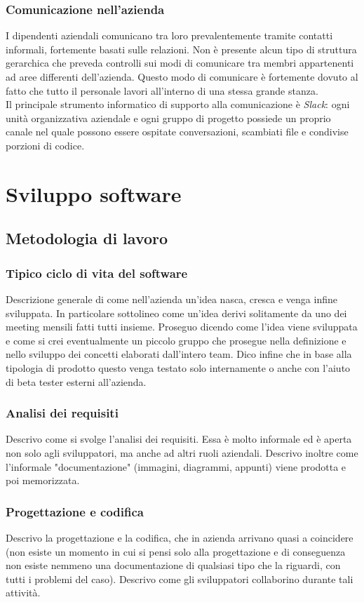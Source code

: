 			\subsubsection{Comunicazione nell'azienda}
				I dipendenti aziendali comunicano tra loro prevalentemente tramite contatti informali, fortemente basati sulle
				relazioni. Non è presente alcun tipo di struttura gerarchica che preveda controlli sui modi di comunicare tra membri
				appartenenti ad aree differenti dell'azienda. Questo modo di comunicare è fortemente dovuto al fatto che tutto il
				personale lavori all'interno di una stessa grande stanza.\\
				Il principale strumento informatico di supporto alla comunicazione è \emph{Slack}:
				ogni unità organizzativa aziendale e ogni gruppo di progetto possiede un proprio canale nel quale possono essere
				ospitate conversazioni, scambiati file e condivise porzioni di codice.
	\section{Sviluppo software}
		\subsection{Metodologia di lavoro}
			\subsubsection{Tipico ciclo di vita del software}
				Descrizione generale di come nell'azienda un'idea nasca, cresca e venga infine sviluppata. In particolare sottolineo
				come un'idea derivi solitamente da uno dei meeting mensili fatti tutti insieme. Proseguo dicendo come l'idea viene
				sviluppata e come si crei eventualmente un piccolo gruppo che prosegue nella definizione e nello sviluppo dei
				concetti elaborati dall'intero team. Dico infine che in base alla tipologia di prodotto questo venga testato solo
				internamente o anche con l'aiuto di beta tester esterni all'azienda.
			\subsubsection{Analisi dei requisiti}
				Descrivo come si svolge l'analisi dei requisiti. Essa è molto informale ed è aperta non solo agli sviluppatori, ma
				anche ad altri ruoli aziendali. Descrivo inoltre come l'informale "documentazione" (immagini, diagrammi, appunti)
				viene prodotta e poi memorizzata.
			\subsubsection{Progettazione e codifica}
				Descrivo la progettazione e la codifica, che in azienda arrivano quasi a coincidere (non esiste un momento in cui
				si pensi solo alla progettazione e di conseguenza non esiste nemmeno una documentazione di qualsiasi tipo che la
				riguardi, con tutti i problemi del caso). Descrivo come gli sviluppatori collaborino durante tali attività.
